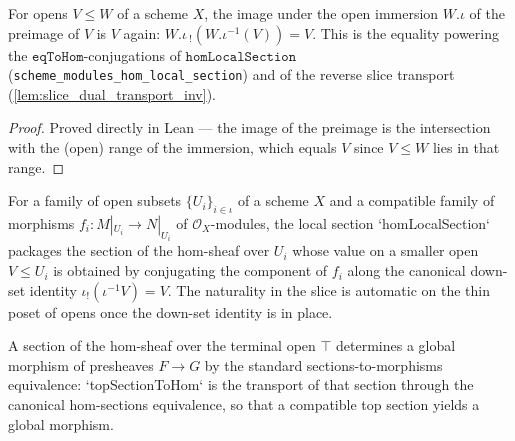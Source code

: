 \begin{lemma}[Down-set image identity \(\iota_!(\iota^{-1}V) = V\)]\leanok
  \label{lem:image_preimage_of_le}
  For opens \(V \le W\) of a scheme \(X\), the image under the open immersion \(W.\iota\) of
  the preimage of \(V\) is \(V\) again: \(W.\iota\,{}_!(W.\iota^{-1}(V)) = V\). This is the
  equality powering the \(\mathtt{eqToHom}\)-conjugations of \(\mathtt{homLocalSection}\)
  (\texttt{scheme\_modules\_hom\_local\_section}) and of the reverse slice transport
  (\cref{lem:slice_dual_transport_inv}).
\end{lemma}
\begin{proof}




\leanok
  Proved directly in Lean --- the image of the preimage is the intersection with the
  (open) range of the immersion, which equals \(V\) since \(V \le W\) lies in that range.
\end{proof}

\begin{definition}\leanok
  \label{def:scheme_modules_hom_local_section}
  For a family of open subsets \(\{U_i\}_{i \in \iota}\) of a scheme \(X\) and a compatible
  family of morphisms \(f_i : M|_{U_i} \to N|_{U_i}\) of \(\mathcal{O}_X\)-modules, the
  local section `homLocalSection` packages the section of the hom-sheaf over \(U_i\) whose
  value on a smaller open \(V \le U_i\) is obtained by conjugating the component of \(f_i\)
  along the canonical down-set identity \(\iota_!(\iota^{-1}V) = V\). The naturality in the
  slice is automatic on the thin poset of opens once the down-set identity is in place.
\end{definition}

\begin{definition}\leanok
  \label{def:scheme_modules_top_section_to_hom}
  A section of the hom-sheaf over the terminal open \(\top\) determines a global
  morphism of presheaves \(F \to G\) by the standard sections-to-morphisms equivalence:
  `topSectionToHom` is the transport of that section through the canonical
  hom-sections equivalence, so that a compatible top section yields a global morphism.
\end{definition}

